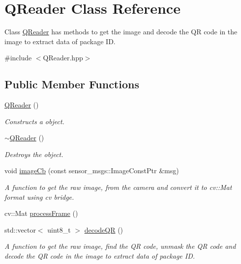 \hypertarget{classQReader}{}\section{Q\+Reader Class Reference}
\label{classQReader}


Class \hyperlink{classQReader}{Q\+Reader} has methods to get the image and decode the QR code in the image to extract data of package ID.  




{\ttfamily \#include $<$Q\+Reader.\+hpp$>$}

\subsection*{Public Member Functions}
\begin{DoxyCompactItemize}
\item 
\hyperlink{classQReader_a88aa40e37ee8602e613b884eac08db36}{Q\+Reader} ()
\begin{DoxyCompactList}\small\item\em Constructs a object. \end{DoxyCompactList}\item 
\hyperlink{classQReader_af097eb209e44cff3f22154415fe36dc6}{$\sim$\+Q\+Reader} ()
\begin{DoxyCompactList}\small\item\em Destroys the object. \end{DoxyCompactList}\item 
void \hyperlink{classQReader_a9d50ba0c8a2c6cea9c2bb00462b9f69c}{image\+Cb} (const sensor\+\_\+msgs\+::\+Image\+Const\+Ptr \&msg)
\begin{DoxyCompactList}\small\item\em A function to get the raw image, from the camera and convert it to cv\+::\+Mat format using cv bridge. \end{DoxyCompactList}\item 
cv\+::\+Mat \hyperlink{classQReader_ac0f5e59eef0b0c3de524a5674a3b3881}{process\+Frame} ()
\item 
std\+::vector$<$ uint8\+\_\+t $>$ \hyperlink{classQReader_ab9ade89b5a75d478896fc4d53769517b}{decode\+QR} ()
\begin{DoxyCompactList}\small\item\em A function to get the raw image, find the QR code, unmask the QR code and decode the QR code in the image to extract data of package ID. \end{DoxyCompactList}\item 

\end{DoxyCompactItemize}
